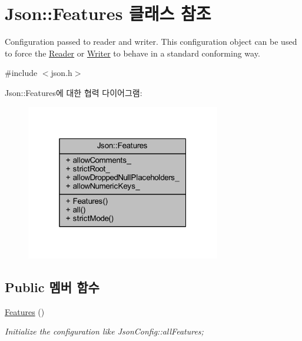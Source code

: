\hypertarget{class_json_1_1_features}{}\section{Json\+:\+:Features 클래스 참조}
\label{class_json_1_1_features}


Configuration passed to reader and writer. This configuration object can be used to force the \hyperlink{class_json_1_1_reader}{Reader} or \hyperlink{class_json_1_1_writer}{Writer} to behave in a standard conforming way.  




{\ttfamily \#include $<$json.\+h$>$}



Json\+:\+:Features에 대한 협력 다이어그램\+:\nopagebreak
\begin{figure}[H]
\begin{center}
\leavevmode
\includegraphics[width=241pt]{class_json_1_1_features__coll__graph}
\end{center}
\end{figure}
\subsection*{Public 멤버 함수}
\begin{DoxyCompactItemize}
\item 
\hyperlink{class_json_1_1_features_ad15a091cb61bb31323299a95970d2644}{Features} ()
\begin{DoxyCompactList}\small\item\em Initialize the configuration like Json\+Config\+::all\+Features; \end{DoxyCompactList}\end{DoxyCompactItemize}
